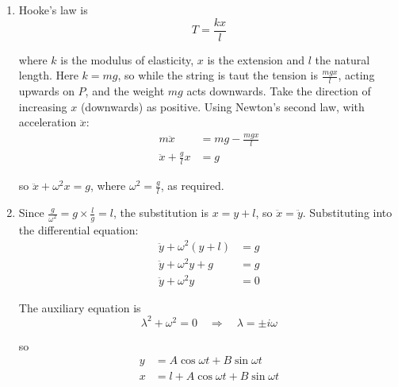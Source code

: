 \documentclass[leqno]{article}
\begin{document}
\begin{enumerate}[
  label=\textbf{\arabic*.},
  leftmargin=*,
  topsep=0pt,
  partopsep=0pt,
  parsep=0pt
]
\begin{djsSolution}
\begin{enumerate}[label=\textbf{(\alph*)}, start=1]
where state 0 is when the string first becomes taut and state 1 is the lowest point. The elastic potential energy is
\[
EPE=\frac{kx^2}{2l}
\]

where \(k\) is the modulus of elasticity, \(x\) is the extension and \(l\) the natural length; here \(k=mg\). Take the final position as the zero level for gravitational potential energy. No other force does work, so \(\sum W_{\text{other}}=0\). Substituting:
\begin{align*}
\tfrac12 m(3gl)+mgd+0+0&=0+0+\frac{mgd^2}{2l}\\
3l^2+2ld&=d^2\\
d^2-2ld-3l^2&=0\\
(d-3l)(d+l)&=0
\end{align*}

Since \(d>0\), \(d=3l\), so the greatest length of the string is \(l+3l=4l\), as required.

\item Hooke's law is
\[
T=\frac{kx}{l}
\]

where \(k\) is the modulus of elasticity, \(x\) is the extension and \(l\) the natural length. Here \(k=mg\), so while the string is taut the tension is \(\frac{mgx}{l}\), acting upwards on \(P\), and the weight \(mg\) acts downwards. Take the direction of increasing \(x\) (downwards) as positive. Using Newton's second law, with acceleration \(\ddot{x}\):
\begin{align*}
m\ddot{x}&=mg-\frac{mgx}{l}\\
\ddot{x}+\frac{g}{l}x&=g
\end{align*}

so \(\ddot{x}+\omega^2x=g\), where \(\omega^2=\frac{g}{l}\), as required.

\item Since \(\frac{g}{\omega^2}=g\times\frac{l}{g}=l\), the substitution is \(x=y+l\), so \(\ddot{x}=\ddot{y}\). Substituting into the differential equation:
\begin{align*}
\ddot{y}+\omega^2(y+l)&=g\\
\ddot{y}+\omega^2y+g&=g\\
\ddot{y}+\omega^2y&=0
\end{align*}

The auxiliary equation is
\[
\lambda^2+\omega^2=0\quad\Longrightarrow\quad\lambda=\pm i\omega
\]

so
\begin{align*}
y&=A\cos\omega t+B\sin\omega t\\
x&=l+A\cos\omega t+B\sin\omega t
\end{align*}


\end{enumerate}
\end{djsSolution}
\end{enumerate}
\end{document}
